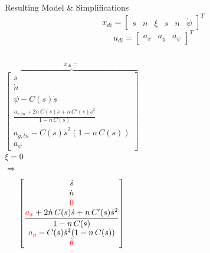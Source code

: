 \documentclass[shortpres,aspectratio=43]{beamer}
\begin{document}
\begin{frame}{Resulting Model \& Simplifications}
  \begin{equation}
    x_{di} = \begin{bmatrix}
      s       &
      n       &
      \xi     &
      \dot{s} &
      \dot{n} &
      \dot{\psi}
    \end{bmatrix}^T
  \end{equation}
  \begin{equation}
    u_{di} = \begin{bmatrix}
      a_x &
      a_y &
      a_\psi
    \end{bmatrix}^T
  \end{equation}
  \begin{columns}[c]
    \[
      \overbrace{
        \begin{bmatrix}
          \dot{s}                                                                                \\
          \dot{n}                                                                                \\
          \dot{\psi} - C(s)\dot{s}                                                               \\
          \displaystyle \frac{a_{x,tn} + 2\dot{n}\,C(s)\dot{s} + n\,C'(s)\dot{s}^2}{1 - n\,C(s)} \\
          a_{y,tn} - C(s)\dot{s}^2(1 - n\,C(s))                                                  \\
          a_\psi
        \end{bmatrix}}^{\dot{x}_{di} =}
    \]
    \centering
    $\xi = 0$\\[0.3cm]
    $\Longrightarrow$
    \[
      \begin{bmatrix}
        \dot{s}                                                                                            \\
        \dot{n}                                                                                            \\
        \textcolor{red}{0}                                                                                 \\
        \displaystyle \frac{\textcolor{red}{a_x} + 2\dot{n}\,C(s)\dot{s} + n\,C'(s)\dot{s}^2}{1 - n\,C(s)} \\
        \textcolor{red}{a_y} - C(s)\dot{s}^2(1 - n\,C(s))                                                  \\
        \textcolor{red}{\ddot{\theta}}
      \end{bmatrix}
    \]
  \end{columns}
\end{frame}
\end{document}
